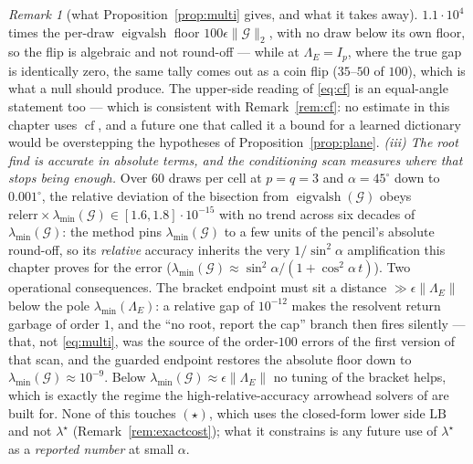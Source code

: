 \documentclass[11pt]{article}
\theoremstyle{remark}
\newtheorem{remark}{Remark}[section]
\newcommand{\Gr}{\mathcal{G}}
\newcommand{\Le}{\Lambda_E}
\begin{document}
\begin{remark}[what Proposition~\ref{prop:multi} gives, and what it takes away]
$1.1\cdot10^{4}$ times the per-draw $\operatorname{eigvalsh}$ floor $100\epsilon\|\Gr\|_2$, with no
draw below its own floor, so the flip is algebraic and not round-off --- while at $\Le=I_p$, where the
true gap is identically zero, the same tally comes out as a coin flip ($35$--$50$ of $100$), which is
what a null should produce.
The upper-side reading of \eqref{eq:cf} is an equal-angle statement too --- which is consistent with
Remark~\ref{rem:cf}: no estimate in this chapter uses $\operatorname{cf}$, and a future one that
called it a bound for a learned dictionary would be overstepping the hypotheses of
Proposition~\ref{prop:plane}.
\emph{(iii) The root find is accurate in absolute terms, and the conditioning scan measures where that stops
being enough.} Over $60$ draws per cell at $p=q=3$ and $\alpha=45^\circ$ down to $0.001^\circ$, the
relative deviation of the bisection from $\operatorname{eigvalsh}(\Gr)$ obeys
$\mathrm{relerr}\times\lambda_{\min}(\Gr)\in[1.6,1.8]\cdot10^{-15}$ with no trend across six decades of
$\lambda_{\min}(\Gr)$: the method pins $\lambda_{\min}(\Gr)$ to a few units of the pencil's absolute
round-off, so its \emph{relative} accuracy inherits the very $1/\sin^{2}\alpha$ amplification this
chapter proves for the error ($\lambda_{\min}(\Gr)\approx\sin^{2}\alpha/(1+\cos^{2}\alpha\,t)$).
Two operational consequences. The bracket endpoint must sit a distance $\gg\epsilon\|\Le\|$ below the
pole $\lambda_{\min}(\Le)$: a relative gap of $10^{-12}$ makes the resolvent return garbage of order
$1$, and the ``no root, report the cap'' branch then fires silently --- that, not \eqref{eq:multi}, was
the source of the order-$100$ errors of the first version of that scan, and the guarded endpoint restores
the absolute floor down to $\lambda_{\min}(\Gr)\approx10^{-9}$. Below
$\lambda_{\min}(\Gr)\approx\epsilon\|\Le\|$ no tuning of the bracket helps, which is exactly the regime
the high-relative-accuracy arrowhead solvers of \cite{stor2013} are built for. None of this
touches $(\star)$, which uses the closed-form lower side $\mathrm{LB}$ and not $\lambda^{\star}$
(Remark~\ref{rem:exactcost}); what it constrains is any future use of $\lambda^{\star}$ as a
\emph{reported number} at small $\alpha$.
\end{remark}
\end{document}
